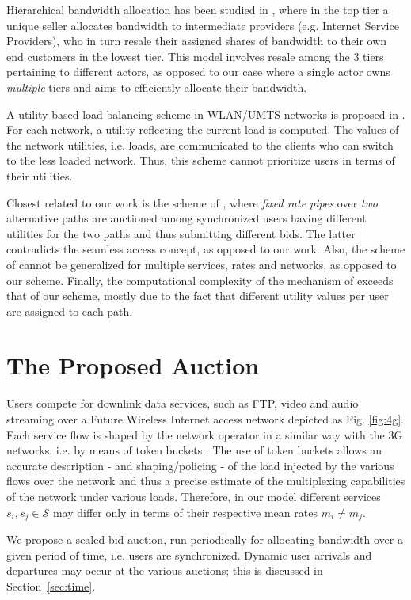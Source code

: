 \documentclass[a4paper]{article}
\begin{document}
Hierarchical
bandwidth allocation has been studied in \cite{marina}, where in the top tier 
a unique seller allocates bandwidth to intermediate providers (e.g. Internet 
Service Providers), who in turn resale their assigned shares of bandwidth to 
their own end customers in the lowest tier. This model involves
resale among the 3 tiers pertaining to different actors, as opposed to
our case where a single actor owns {\em multiple} tiers and aims to efficiently 
allocate their bandwidth.

A utility-based load balancing scheme in WLAN/UMTS networks is proposed in \cite{umts}. 
For each network, a utility reflecting the current load is computed. The values
of the network utilities, i.e. loads, are communicated to the clients who can switch to
the less loaded  network. Thus, this scheme cannot prioritize users in terms of their
utilities. 

Closest related to our work is the scheme of \cite{gds}, where {\em fixed rate pipes}
over {\em two} alternative paths are auctioned among synchronized users having different 
utilities for the two paths and thus submitting different bids. The latter
contradicts the seamless access concept, as opposed to our work.
Also, the scheme of \cite{gds} cannot be generalized 
for multiple services, rates and networks, as opposed to our scheme.
Finally, the computational complexity of the mechanism of \cite{gds} exceeds 
that of our scheme, mostly due to the fact that different utility values per user
are assigned to each path. 

\section{The Proposed Auction}\label{sec:auc}

Users compete for downlink data services, such as FTP, 
video and audio streaming over a Future Wireless Internet access network 
depicted as Fig. \ref{fig:4g}. 
Each service flow is shaped by the network operator
in a similar way with the 3G networks, i.e. by means of token buckets 
\cite{3gpp}. The use of token buckets allows an accurate description - and
shaping/policing - of the load injected by the various flows over the network and
thus a precise estimate of the multiplexing capabilities of the network
under various loads. 
Therefore, in our model different services $s_i, s_j \in \mathcal{S}$ may
differ only in terms of their respective mean rates $m_i \neq m_j$. 

We propose a sealed-bid auction, run 
periodically for allocating bandwidth over a given period of time, i.e. users
are synchronized. Dynamic user arrivals and departures may occur at the various 
auctions; this is discussed in Section~\ref{sec:time}. 
\end{document}
